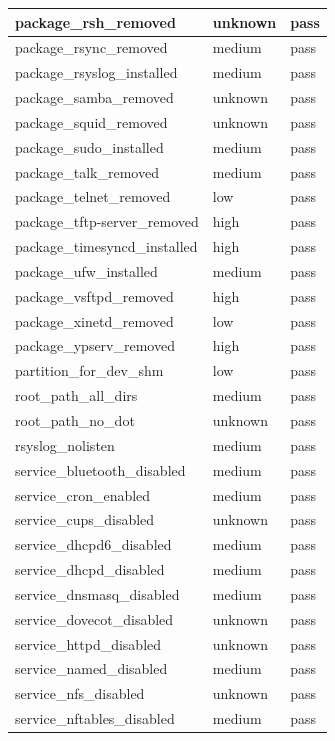 \begin{longtable}{|p{10cm}|p{2cm}|p{2cm}|}
\hline
package\_rsh\_removed & unknown & pass \\
\hline
package\_rsync\_removed & medium & pass \\
\hline
package\_rsyslog\_installed & medium & pass \\
\hline
package\_samba\_removed & unknown & pass \\
\hline
package\_squid\_removed & unknown & pass \\
\hline
package\_sudo\_installed & medium & pass \\
\hline
package\_talk\_removed & medium & pass \\
\hline
package\_telnet\_removed & low & pass \\
\hline
package\_tftp-server\_removed & high & pass \\
\hline
package\_timesyncd\_installed & high & pass \\
\hline
package\_ufw\_installed & medium & pass \\
\hline
package\_vsftpd\_removed & high & pass \\
\hline
package\_xinetd\_removed & low & pass \\
\hline
package\_ypserv\_removed & high & pass \\
\hline
partition\_for\_dev\_shm & low & pass \\
\hline
root\_path\_all\_dirs & medium & pass \\
\hline
root\_path\_no\_dot & unknown & pass \\
\hline
rsyslog\_nolisten & medium & pass \\
\hline
service\_bluetooth\_disabled & medium & pass \\
\hline
service\_cron\_enabled & medium & pass \\
\hline
service\_cups\_disabled & unknown & pass \\
\hline
service\_dhcpd6\_disabled & medium & pass \\
\hline
service\_dhcpd\_disabled & medium & pass \\
\hline
service\_dnsmasq\_disabled & medium & pass \\
\hline
service\_dovecot\_disabled & unknown & pass \\
\hline
service\_httpd\_disabled & unknown & pass \\
\hline
service\_named\_disabled & medium & pass \\
\hline
service\_nfs\_disabled & unknown & pass \\
\hline
service\_nftables\_disabled & medium & pass \\

\end{longtable}
